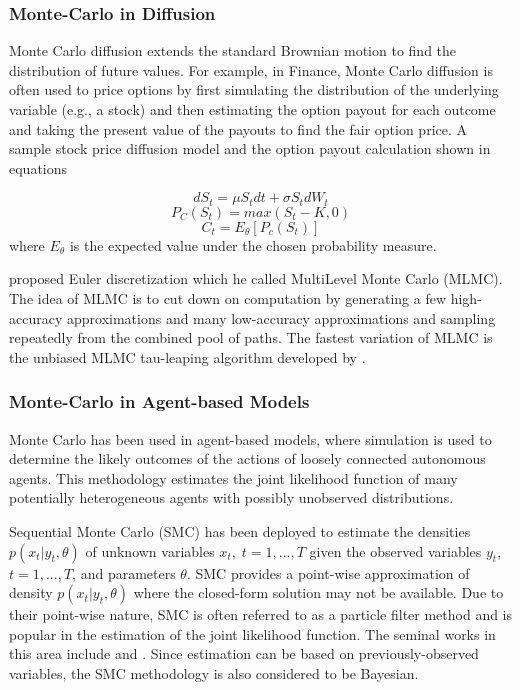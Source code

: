 \documentclass{wscpaperproc}
\theoremstyle{wsc}
\begin{document}
\subsubsection{Monte-Carlo in Diffusion}

Monte Carlo diffusion extends the standard Brownian motion to find the distribution of future values. For example, in Finance, Monte Carlo diffusion is often used to price options by first simulating the distribution of the underlying variable (e.g., a stock) and then estimating the option payout for each outcome and taking the present value of the payouts to find the fair option price. A sample stock price diffusion model and the option payout calculation shown in equations 

\begin{equation}
    dS_t = \mu S_t dt + \sigma S_t dW_t
\end{equation}
\begin{equation}
    P_{C}(S_t) = max(S_t-K,0)
\end{equation}
\begin{equation}
    C_t = E_{\theta}[P_c(S_t)]
\end{equation}
where $E_{\theta}$ is the expected value under the chosen probability measure.

 proposed Euler discretization which he called MultiLevel Monte Carlo (MLMC). The idea of MLMC is to cut down on computation by generating a few high-accuracy approximations and many low-accuracy approximations and sampling repeatedly from the combined pool of paths. The fastest variation of MLMC is the unbiased MLMC tau-leaping algorithm developed by .

\subsubsection{Monte-Carlo in Agent-based Models}

Monte Carlo has been used in agent-based models, where simulation is used to determine the likely outcomes of the actions of loosely connected autonomous agents.  This methodology estimates the joint likelihood function of many potentially heterogeneous agents with possibly unobserved distributions.

Sequential Monte Carlo (SMC) has been deployed to estimate the densities $p(x_t|y_t,\theta)$ of unknown variables $x_t,\;t=1,...,T$ given the observed variables $y_t$, $t=1,...,T$, and parameters $\theta$. SMC provides a point-wise approximation of density $p(x_t|y_t,\theta)$ where the closed-form solution may not be available. Due to their point-wise nature, SMC is often referred to as a particle filter method and is popular in the estimation of the joint likelihood function. The seminal works in this area include  and . Since estimation can be based on previously-observed variables, the SMC methodology is also considered to be Bayesian.  
\end{document}
